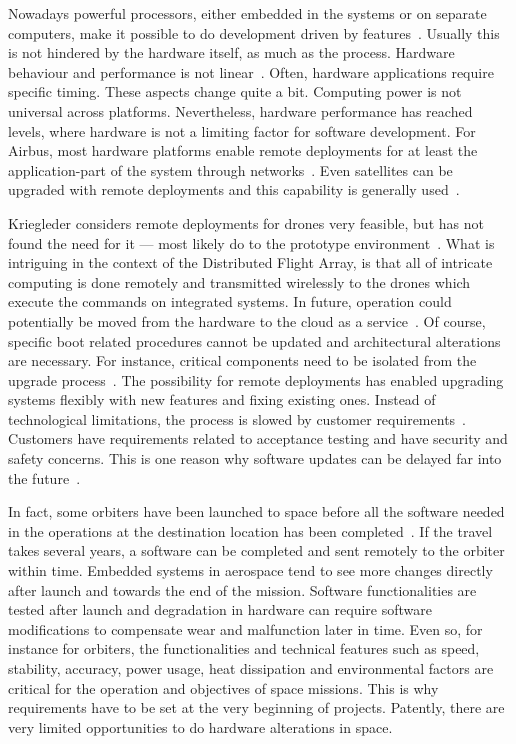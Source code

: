 \documentclass[english]{tktltiki2}
\begin{document}
Nowadays powerful processors, either embedded in the systems or on separate computers, make it possible to do development driven by features~\cite{BT15, Koi15}. Usually this is not hindered by the hardware itself, as much as the process. Hardware behaviour and performance is not linear~\cite{Hol15a}. Often, hardware applications require specific timing. These aspects change quite a bit. Computing power is not universal across platforms. Nevertheless, hardware performance has reached levels, where hardware is not a limiting factor for software development. For Airbus, most hardware platforms enable remote deployments for at least the application-part of the system through networks~\cite{Koi15}. Even satellites can be upgraded with remote deployments and this capability is generally used~\cite{Hol15b}.

Kriegleder considers remote deployments for drones very feasible, but has not found the need for it — most likely do to the prototype environment~\cite{Kri15}. What is intriguing in the context of the Distributed Flight Array, is that all of intricate computing is done remotely and transmitted wirelessly to the drones which execute the commands on integrated systems. In future, operation could potentially be moved from the hardware to the cloud as a service~\cite{Kri15}. Of course, specific boot related procedures cannot be updated and architectural alterations are necessary. For instance, critical components need to be isolated from the upgrade process~\cite{Kri15}. The possibility for remote deployments has enabled upgrading systems flexibly with new features and fixing existing ones. Instead of technological limitations, the process is slowed by customer requirements~\cite{BT15, Hol15b, Koi15}. Customers have requirements related to acceptance testing and have security and safety concerns. This is one reason why software updates can be delayed far into the future~\cite{BT15, Hol15b, Koi15}.

In fact, some orbiters have been launched to space before all the software needed in the operations at the destination location has been completed~\cite{Hol15b}. If the travel takes several years, a software can be completed and sent remotely to the orbiter within time. Embedded systems in aerospace tend to see more changes directly after launch and towards the end of the mission. Software functionalities are tested after launch and degradation in hardware can require software modifications to compensate wear and malfunction later in time. Even so, for instance for orbiters, the functionalities and technical features such as speed, stability, accuracy, power usage, heat dissipation and environmental factors are critical for the operation and objectives of space missions. This is why requirements have to be set at the very beginning of projects. Patently, there are very limited opportunities to do hardware alterations in space.
\end{document}
